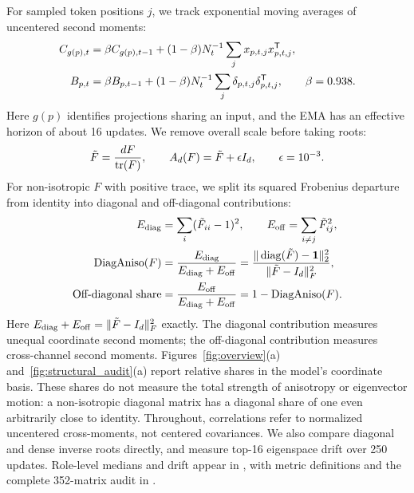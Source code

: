 For sampled token positions $j$, we track exponential moving averages of uncentered second moments:
\begin{align}
 C_{g(p),t}&=\beta C_{g(p),t-1}+(1-\beta)N_t^{-1}\sum_jx_{p,t,j}x_{p,t,j}^{{\mathsf{T}}},\nonumber\\
 B_{p,t}&=\beta B_{p,t-1}+(1-\beta)N_t^{-1}\sum_j\delta_{p,t,j}\delta_{p,t,j}^{{\mathsf{T}}},
 \qquad \beta=0.938.
 \label{eq:moments}
\end{align}
Here $g(p)$ identifies projections sharing an input, and the EMA has an effective horizon of about 16 updates. We remove overall scale before taking roots:
\begin{equation}
 \tilde F=\frac{dF}{\operatorname{tr}(F)},\qquad A_d(F)=\tilde F+\epsilon I_d,\qquad\epsilon=10^{-3}.
 \label{eq:trace_norm}
\end{equation}
For non-isotropic $F$ with positive trace, we split its squared Frobenius departure from identity into diagonal and off-diagonal contributions:
\begin{equation}
 \begin{aligned}
 E_{\rm diag}&=\sum_i(\tilde F_{ii}-1)^2,\qquad E_{\rm off}=\sum_{i\ne j}\tilde F_{ij}^2,\\
 \mathrm{DiagAniso}(F)&=\frac{E_{\rm diag}}{E_{\rm diag}+E_{\rm off}}
 =\frac{\|\operatorname{diag}(\tilde F)-\mathbf1\|_2^2}{\|\tilde F-I_d\|_F^2},\\
 \text{Off-diagonal share}&=\frac{E_{\rm off}}{E_{\rm diag}+E_{\rm off}}
 =1-\mathrm{DiagAniso}(F).
 \end{aligned}
 \label{eq:diag_aniso}
\end{equation}
Here $E_{\rm diag}+E_{\rm off}=\|\tilde F-I_d\|_F^2$ exactly. The diagonal contribution measures unequal coordinate second moments; the off-diagonal contribution measures cross-channel second moments. Figures~\ref{fig:overview}(a) and~\ref{fig:structural_audit}(a) report relative shares in the model's coordinate basis. These shares do not measure the total strength of anisotropy or eigenvector motion: a non-isotropic diagonal matrix has a diagonal share of one even arbitrarily close to identity. Throughout, correlations refer to normalized uncentered cross-moments, not centered covariances. We also compare diagonal and dense inverse roots directly, and measure top-16 eigenspace drift over 250 updates. Role-level medians and drift appear in , with metric definitions and the complete 352-matrix audit in .

